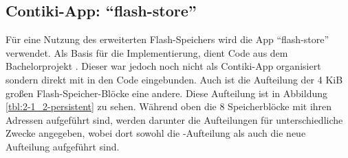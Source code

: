 \subsection{Contiki-App: "`flash-store"'}

Für eine Nutzung des erweiterten Flash-Speichers wird die App "`flash-store"' verwendet. Als Basis für die Implementierung, dient Code aus dem Bachelorprojekt
. Dieser war jedoch noch nicht als Contiki-App organisiert sondern direkt mit in den Code eingebunden. Auch ist die Aufteilung der 4 KiB großen
Flash-Speicher-Blöcke eine andere. Diese Aufteilung ist in Abbildung \ref{tbl:2-1_2-persistent} zu sehen. Während oben die 8 Speicherblöcke mit ihren Adressen
aufgeführt sind, werden darunter die Aufteilungen für unterschiedliche Zwecke angegeben, wobei dort sowohl die -Aufteilung als auch die neue
Aufteilung aufgeführt sind.

